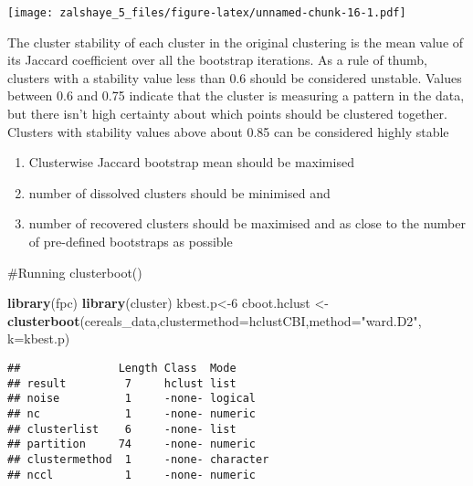\documentclass[
]{article}
\newenvironment{Shaded}{\begin{snugshade}}{\end{snugshade}}
\newcommand{\DataTypeTok}[1]{\textcolor[rgb]{0.13,0.29,0.53}{#1}}
\newcommand{\DecValTok}[1]{\textcolor[rgb]{0.00,0.00,0.81}{#1}}
\newcommand{\KeywordTok}[1]{\textcolor[rgb]{0.13,0.29,0.53}{\textbf{#1}}}
\newcommand{\NormalTok}[1]{#1}
\newcommand{\OperatorTok}[1]{\textcolor[rgb]{0.81,0.36,0.00}{\textbf{#1}}}
\newcommand{\StringTok}[1]{\textcolor[rgb]{0.31,0.60,0.02}{#1}}
\providecommand{\tightlist}{%
  \setlength{\itemsep}{0pt}\setlength{\parskip}{0pt}}
\begin{document}
\texttt{[image: zalshaye\_5\_files/figure-latex/unnamed-chunk-16-1.pdf]}

The cluster stability of each cluster in the original clustering is the
mean value of its Jaccard coefficient over all the bootstrap iterations.
As a rule of thumb, clusters with a stability value less than 0.6 should
be considered unstable. Values between 0.6 and 0.75 indicate that the
cluster is measuring a pattern in the data, but there isn't high
certainty about which points should be clustered together. Clusters with
stability values above about 0.85 can be considered highly stable

\begin{enumerate}
\def\labelenumi{\arabic{enumi}.}
\tightlist
\item
  Clusterwise Jaccard bootstrap mean should be maximised
\item
  number of dissolved clusters should be minimised and
\item
  number of recovered clusters should be maximised and as close to the
  number of pre-defined bootstraps as possible
\end{enumerate}

\#Running clusterboot()

\begin{Shaded}
\begin{Highlighting}[]
\KeywordTok{library}\NormalTok{(fpc)}
\KeywordTok{library}\NormalTok{(cluster)}
\NormalTok{kbest.p<-}\DecValTok{6}
\NormalTok{cboot.hclust <-}\StringTok{ }\KeywordTok{clusterboot}\NormalTok{(cereals_data,}\DataTypeTok{clustermethod=}\NormalTok{hclustCBI,}\DataTypeTok{method=}\StringTok{"ward.D2"}\NormalTok{, }\DataTypeTok{k=}\NormalTok{kbest.p)}
\end{Highlighting}
\end{Shaded}

\begin{Shaded}
\end{Shaded}

\begin{verbatim}
##               Length Class  Mode     
## result         7     hclust list     
## noise          1     -none- logical  
## nc             1     -none- numeric  
## clusterlist    6     -none- list     
## partition     74     -none- numeric  
## clustermethod  1     -none- character
## nccl           1     -none- numeric
\end{verbatim}
\end{document}
